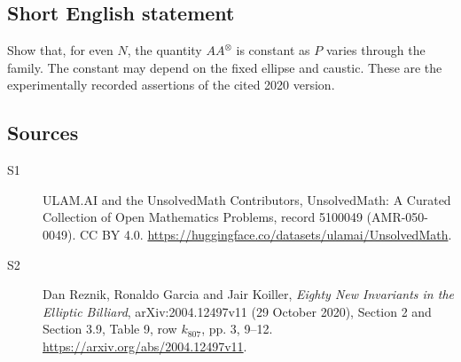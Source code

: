 \documentclass[11pt]{article}
\begin{document}
\subsection{Short English statement}
Show that, for even $N$, the quantity $AA^\otimes$ is constant as $P$ varies through the family. The constant may depend on the fixed ellipse and caustic. These are the experimentally recorded assertions of the cited 2020 version.
\subsection{Sources}
\begin{description}
\item[\hypertarget{source:5100049:1}{S1}] ULAM.AI and the UnsolvedMath Contributors, UnsolvedMath: A Curated Collection of Open Mathematics Problems, record 5100049 (AMR-050-0049). CC BY 4.0. \url{https://huggingface.co/datasets/ulamai/UnsolvedMath}.
\item[\hypertarget{source:5100049:2}{S2}] Dan Reznik, Ronaldo Garcia and Jair Koiller, \emph{Eighty New Invariants in the Elliptic Billiard}, arXiv:2004.12497v11 (29 October 2020), Section 2 and Section 3.9, Table 9, row $k_{807}$, pp. 3, 9--12. \url{https://arxiv.org/abs/2004.12497v11}.
\end{description}
\label{end:5100049}
\end{document}
